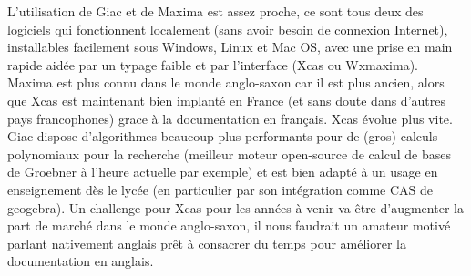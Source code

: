 \documentclass[a4paper,11pt]{article}
\begin{document}
\begin{giacjshere}
L'utilisation de Giac et de Maxima est assez proche, ce sont
tous deux des logiciels qui fonctionnent localement (sans
avoir besoin de connexion Internet),
installables facilement sous Windows, Linux
et Mac OS, avec une prise en main rapide
aid\'ee par un typage faible et par l'interface
(Xcas ou Wxmaxima). Maxima est plus connu dans le monde anglo-saxon
car il est plus ancien, alors que Xcas est maintenant bien
implant\'e en France (et sans doute dans d'autres pays francophones)
grace \`a la documentation en fran\c{c}ais. Xcas \'evolue plus vite.
Giac dispose d'algorithmes beaucoup plus
performants pour de (gros) calculs polynomiaux pour la recherche
(meilleur moteur open-source de calcul de bases de Groebner 
\`a l'heure actuelle par exemple)
et est bien adapt\'e \`a un usage
en enseignement d\`es le lyc\'ee (en particulier 
par son int\'egration comme CAS de geogebra). Un challenge pour Xcas
pour les ann\'ees \`a venir va \^etre d'augmenter la part
de march\'e dans le monde anglo-saxon, il nous faudrait
un amateur motiv\'e parlant nativement anglais pr\^et \`a consacrer
du temps pour am\'eliorer la documentation en anglais.


\end{giacjshere}
\end{document}
